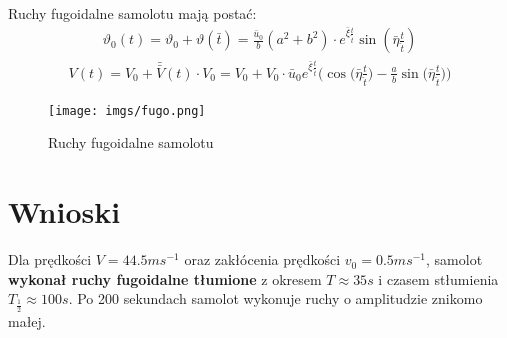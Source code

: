 \documentclass{sprawozdanie}
\begin{document}
Ruchy fugoidalne samolotu mają postać:
\begin{align*}
    \vartheta_0 (t) = \vartheta_{0} + \vartheta (\bar t) = \frac{\bar u_0}{b} (a^2+b^2) \cdot e^{\bar \xi \frac{t}{\hat t}} \sin(\bar \eta \frac{t}{\hat t} )
\end{align*}
\begin{align*}
    V(t) = V_0 + \bar \bar V(t)\cdot V_0 = V_0 + V_0 \cdot \bar u_0 e^{\bar \xi \frac{t}{\hat t}} \Big( \cos \Big( \bar \eta \frac{t}{\hat t} \Big)   - \frac{a}{b} \sin \Big( \bar \eta \frac{t}{\hat t} \Big) \Big)
\end{align*}

\begin{figure}[H]
    \centering
    \texttt{[image: imgs/fugo.png]}
    \caption{Ruchy fugoidalne samolotu}

\end{figure}

\section{Wnioski}
Dla prędkości $V = 44.5 ms^{-1}$ oraz zakłócenia prędkości $v_0 = 0.5 ms^{-1}$, samolot \textbf{wykonał ruchy fugoidalne tłumione} z okresem $T \approx 35s$ i czasem stłumienia $T_{\frac{1}{2}} \approx 100s$. Po 200 sekundach samolot wykonuje ruchy o amplitudzie znikomo małej.  
\end{document}
